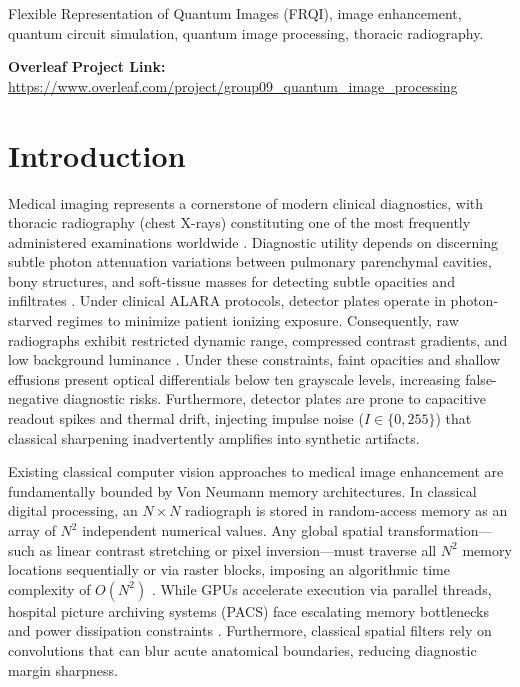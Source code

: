 \documentclass[12pt,onecolumn,draftclsnofoot]{IEEEtran}
\begin{document}
\begin{IEEEkeywords}
Flexible Representation of Quantum Images (FRQI), image enhancement, quantum circuit simulation, quantum image processing, thoracic radiography.
\end{IEEEkeywords}

\noindent\textbf{Overleaf Project Link:} {\small\url{https://www.overleaf.com/project/group09_quantum_image_processing}}

\section{Introduction}
Medical imaging represents a cornerstone of modern clinical diagnostics, with thoracic radiography (chest X-rays) constituting one of the most frequently administered examinations worldwide \cite{wang2017chestxray8}. Diagnostic utility depends on discerning subtle photon attenuation variations between pulmonary parenchymal cavities, bony structures, and soft-tissue masses for detecting subtle opacities and infiltrates \cite{rajpurkar2017chexnet}. Under clinical ALARA protocols, detector plates operate in photon-starved regimes to minimize patient ionizing exposure. Consequently, raw radiographs exhibit restricted dynamic range, compressed contrast gradients, and low background luminance \cite{boyat2015review}. Under these constraints, faint opacities and shallow effusions present optical differentials below ten grayscale levels, increasing false-negative diagnostic risks. Furthermore, detector plates are prone to capacitive readout spikes and thermal drift, injecting impulse noise ($I \in \{0, 255\}$) that classical sharpening inadvertently amplifies into synthetic artifacts.

Existing classical computer vision approaches to medical image enhancement are fundamentally bounded by Von Neumann memory architectures. In classical digital processing, an $N \times N$ radiograph is stored in random-access memory as an array of $N^2$ independent numerical values. Any global spatial transformation---such as linear contrast stretching or pixel inversion---must traverse all $N^2$ memory locations sequentially or via raster blocks, imposing an algorithmic time complexity of $O(N^2)$ \cite{caraiman2014image}. While GPUs accelerate execution via parallel threads, hospital picture archiving systems (PACS) face escalating memory bottlenecks and power dissipation constraints \cite{hu2019quantum}. Furthermore, classical spatial filters rely on convolutions that can blur acute anatomical boundaries, reducing diagnostic margin sharpness.
\end{document}
